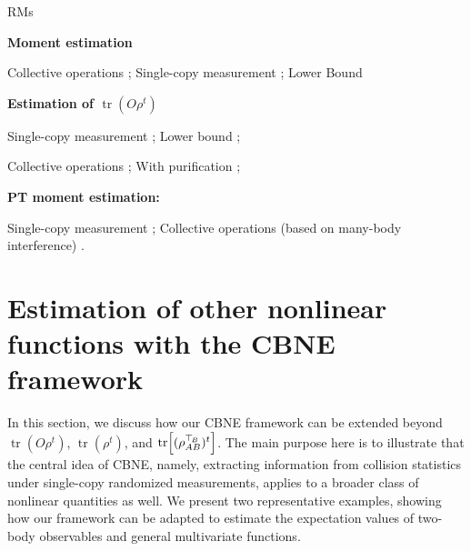 \documentclass[aps,prl,twocolumn,nofootinbib,superscriptaddress,10pt]{revtex4-2}
\let\originalleft\left
\let\originalright\right
\renewcommand{\left}{\mathopen{}\mathclose\bgroup\originalleft}
\renewcommand{\right}{\aftergroup\egroup\originalright}
\DeclareMathOperator{\Tr}{tr}
\theoremstyle{plain}
\theoremstyle{definition}
\begin{document}




RMs 
\cite{brydges2019probing,PhysRevA.99.052323,PhysRevLett.124.010504,elben2020mixedstate,PhysRevLett.127.260501,PhysRevX.14.031035,HKPshadow20,elben2023randomized}

\bigskip
\textbf{Moment estimation}

Collective operations \cite{Quek2024multivariatetrace,liu2025estimating,Shin2025resourceefficient,shi2025near,subacsi2019entanglement};
Single-copy measurement \cite{pelecanos2026beating,PhysRevLett.108.110503,singlezhou,anshu2022distributed,PhysRevLett.124.010504}; 
Lower Bound \cite{chen2022exponential,gong2024sample,aharonov2022quantum}

\bigskip
\textbf{Estimation of $\Tr(O\rho^t)$}

Single-copy measurement \cite{du2025optimal,PRXQuantum.4.010303}; 
Lower bound \cite{huang2022quantum,du2025optimal,ye2025exponential};

Collective operations \cite{zhou2024hybrid,liu2024auxiliary,zhang2025measuring,chen2025simultaneous,Shin2025resourceefficient,shi2025near,ye2025exponential,PhysRevLett.88.217901,bruni2004measurimg}; 
With purification 
\cite{liu2024exponential,zhang2025measuring,chen2025simultaneous}; 




\bigskip
\textbf{PT moment estimation:}

Single-copy measurement
\cite{elben2020mixedstate,singlezhou,PhysRevX.14.031035}; 
Collective operations
(based on many-body interference) 
\cite{PhysRevLett.121.150503,PhysRevLett.94.040502,PhysRevA.99.062309}. 
\fi



\section{Estimation of other nonlinear functions with the CBNE framework}\label{sec:OtherNonlinear}

In this section, we discuss how our CBNE framework can be extended beyond $\Tr(O\rho^t)$, $\Tr(\rho^t)$, and $\Tr\left[(\rho_{AB}^{\top_{\! B}})^t\right]$. 
The main purpose here is to illustrate that the central idea of CBNE, namely, extracting information from collision statistics under single-copy randomized measurements, applies to a broader class of nonlinear quantities as well. 
We present two representative examples, 
showing how our framework can be adapted to estimate the expectation values of two-body observables and general multivariate functions.
 
\end{document}
